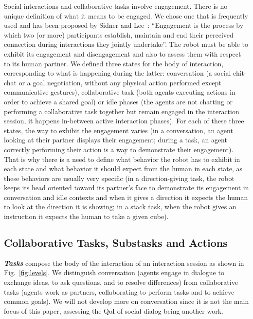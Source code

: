 \documentclass[a4paper,11pt,twoside]{StyleThese}
\begin{document}
Social interactions and collaborative tasks involve engagement. There is no unique definition of what it means to be engaged. We chose one that is frequently used and has been proposed by Sidner and Lee~\cite{sidner_2003_engagement}: ``Engagement is the process by which two (or more) participants establish, maintain and end their perceived connection during interactions they jointly undertake''. The robot must be able to exhibit its engagement and disengagement and also to assess them with respect to its human partner.
We defined three states for the body of interaction, corresponding to what is happening during the latter: conversation (\ie a social chit-chat or a goal negotiation, without any physical action performed except communicative gestures), collaborative task (\ie both agents executing actions in order to achieve a shared goal) or idle phases (\ie the agents are not chatting or performing a collaborative task together but remain engaged in the interaction session, it happens in-between active interaction phases). For each of these three states, the way to exhibit the engagement varies (\eg in a conversation, an agent looking at their partner displays their engagement; during a task, an agent correctly performing their action is a way to demonstrate their engagement). That is why there is a need to define what behavior the robot has to exhibit in each state and what behavior it should expect from the human in each state, as these behaviors are usually very specific (\eg in a direction-giving task, the robot keeps its head oriented toward its partner's face to demonstrate its engagement in conversation and idle contexts and when it gives a direction it expects the human to look at the direction it is showing; in a stack task, when the robot gives an instruction it expects the human to take a given cube).




\subsection{Collaborative Tasks, Substasks and Actions}
\textbf{\textit{Tasks}} compose the body of the interaction of an interaction session as shown in Fig.~\ref{fig:levels}. We distinguish conversation (\ie agents engage in dialogue to exchange ideas, to ask questions, and to resolve differences) from collaborative tasks (\ie agents work as partners, collaborating to perform tasks and to achieve common goals). We will not develop more on conversation since it is not the main focus of this paper, assessing the QoI of social dialog being another work.
\end{document}
